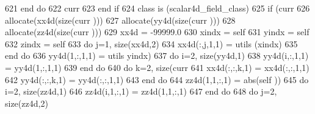 \begin{DoxyCode}
621 \textcolor{keywordflow}{                end do}
622                 curr%
623 \textcolor{keywordflow}{            end if}
624 \textcolor{keywordflow}{        class is} (scalar4d\_field\_class)
625             \textcolor{keywordflow}{if} (curr%
626                 \textcolor{keyword}{allocate}(xx4d(\textcolor{keyword}{size}(curr%
      )))
627                 \textcolor{keyword}{allocate}(yy4d(\textcolor{keyword}{size}(curr%
      )))
628                 \textcolor{keyword}{allocate}(zz4d(\textcolor{keyword}{size}(curr%
      )))
629                 xx4d = -99999.0
630                 xindx = self%
631                 yindx = self%
632                 zindx = self%
633                 \textcolor{keywordflow}{do} j=1, \textcolor{keyword}{size}(xx4d,2)
634                     xx4d(:,j,1,1) = utils%
      (xindx)%
635 \textcolor{keywordflow}{                end do}
636                 yy4d(1,:,1,1) = utils%
      yindx)%
637                 \textcolor{keywordflow}{do} i=2, \textcolor{keyword}{size}(yy4d,1)
638                     yy4d(i,:,1,1) = yy4d(1,:,1,1)
639 \textcolor{keywordflow}{                end do}
640                 \textcolor{keywordflow}{do} k=2, \textcolor{keyword}{size}(curr%
641                     xx4d(:,:,k,1) = xx4d(:,:,1,1)
642                     yy4d(:,:,k,1) = yy4d(:,:,1,1)
643 \textcolor{keywordflow}{                end do}
644                 zz4d(1,1,:,1) = abs(self%
      ))
645                 \textcolor{keywordflow}{do} i=2, \textcolor{keyword}{size}(zz4d,1)
646                     zz4d(i,1,:,1) = zz4d(1,1,:,1)
647 \textcolor{keywordflow}{                end do}
648                 \textcolor{keywordflow}{do} j=2, \textcolor{keyword}{size}(zz4d,2)

\end{DoxyCode}

